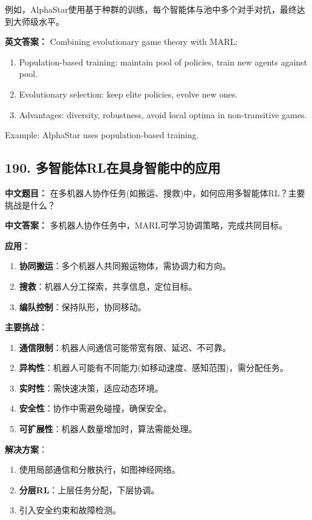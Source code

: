 \documentclass[10pt,a4paper]{ctexart}
\begin{document}
例如，AlphaStar使用基于种群的训练，每个智能体与池中多个对手对抗，最终达到大师级水平。

\textbf{英文答案：}  
Combining evolutionary game theory with MARL:

\begin{enumerate}
    \item Population-based training: maintain pool of policies, train new agents against pool.
    \item Evolutionary selection: keep elite policies, evolve new ones.
    \item Advantages: diversity, robustness, avoid local optima in non-transitive games.
\end{enumerate}

Example: AlphaStar uses population-based training.

\subsection*{190. 多智能体RL在具身智能中的应用}
\textbf{中文题目：} 在多机器人协作任务(如搬运、搜救)中，如何应用多智能体RL？主要挑战是什么？

\textbf{中文答案：}  
多机器人协作任务中，MARL可学习协调策略，完成共同目标。

\textbf{应用}：
\begin{enumerate}
    \item \textbf{协同搬运}：多个机器人共同搬运物体，需协调力和方向。
    \item \textbf{搜救}：机器人分工探索，共享信息，定位目标。
    \item \textbf{编队控制}：保持队形，协同移动。
\end{enumerate}

\textbf{主要挑战}：
\begin{enumerate}
    \item \textbf{通信限制}：机器人间通信可能带宽有限、延迟、不可靠。
    \item \textbf{异构性}：机器人可能有不同能力(如移动速度、感知范围)，需分配任务。
    \item \textbf{实时性}：需快速决策，适应动态环境。
    \item \textbf{安全性}：协作中需避免碰撞，确保安全。
    \item \textbf{可扩展性}：机器人数量增加时，算法需能处理。
\end{enumerate}

\textbf{解决方案}：
\begin{enumerate}
    \item 使用局部通信和分散执行，如图神经网络。
    \item \textbf{分层RL}：上层任务分配，下层协调。
    \item 引入安全约束和故障检测。
\end{enumerate}
\end{document}
